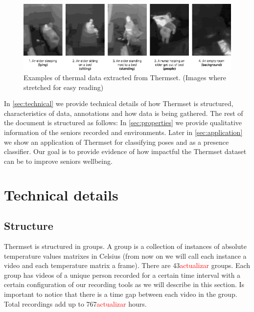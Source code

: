 \documentclass[oneside, twocolumn]{article}
\newcommand\myworries[1]{\textcolor{red}{#1}}
\begin{document}
\begin{figure}
  \centering
    \includegraphics[width=1.0\textwidth]{images/examples}
  \caption{Examples of thermal data extracted from Thermset. (Images where stretched for easy reading)}
  \label{fig:examples}
\end{figure}



In \autoref{sec:technical} we provide technical details of how Thermset is structured, characteristics of data, annotations and how data is being gathered. The rest of the document is structured as follows: In \autoref{sec:properties} we provide qualitative information of the seniors recorded and environments. Later in \autoref{sec:application} we show an application of Thermset for classifying poses and as a presence classifier. Our goal is to provide evidence of how impactful the Thermset dataset can be to improve seniors wellbeing.


\section{Technical details}
\label{sec:technical}
\subsection{Structure}
Thermset is structured in groups. A group is a collection of instances of absolute temperature values matrixes in Celsius (from now on we will call each instance a video and each temperature matrix a frame). There are 43\myworries{actualizar} groups. Each group has videos of a unique person recorded for a certain time interval with a certain configuration of our recording tools as we will describe in this section. Is important to notice that there is a time gap between each video in the group. Total recordings add up to 767\myworries{actualizar} hours.
\end{document}
